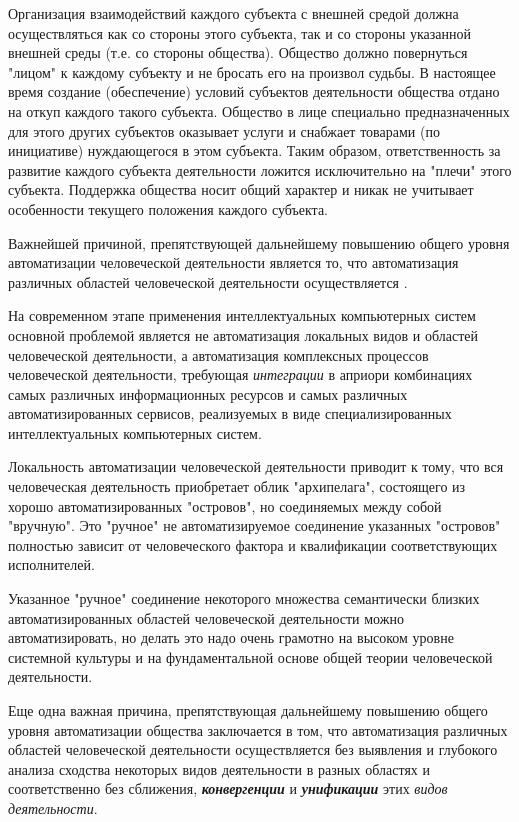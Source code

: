 Организация взаимодействий каждого субъекта с внешней средой должна осуществляться как со стороны этого субъекта, так и со стороны указанной внешней среды (т.е. со стороны общества). Общество должно повернуться "лицом"{} к каждому субъекту и не бросать его на произвол судьбы. В настоящее время создание (обеспечение) условий субъектов деятельности общества отдано на откуп каждого такого субъекта. Общество в лице специально предназначенных для этого других субъектов оказывает услуги и снабжает товарами  (по инициативе) нуждающегося в этом субъекта. Таким образом, ответственность за развитие каждого субъекта деятельности ложится исключительно на "плечи"{} этого субъекта. Поддержка общества носит общий характер и никак не учитывает особенности текущего положения каждого субъекта.

Важнейшей причиной, препятствующей дальнейшему повышению общего уровня автоматизации человеческой деятельности является то, что автоматизация различных областей человеческой деятельности осуществляется .

На современном этапе применения интеллектуальных компьютерных систем основной проблемой является не автоматизация локальных видов и областей человеческой деятельности, а автоматизация комплексных процессов человеческой деятельности, требующая \textit{интеграции} в априори  комбинациях самых различных информационных ресурсов и самых различных автоматизированных сервисов, реализуемых в виде специализированных интеллектуальных компьютерных систем.

Локальность автоматизации человеческой деятельности приводит к тому, что вся человеческая деятельность приобретает облик "архипелага"{}, состоящего из хорошо автоматизированных "островов"{}, но соединяемых между собой "вручную"{}. Это "ручное"{} не автоматизируемое соединение указанных "островов"{} полностью зависит от человеческого фактора и квалификации соответствующих исполнителей.

Указанное "ручное"{} соединение некоторого множества семантически близких автоматизированных областей человеческой деятельности можно автоматизировать, но делать это надо очень грамотно на высоком уровне системной культуры и на фундаментальной основе общей теории человеческой деятельности.

Еще одна важная причина, препятствующая дальнейшему повышению общего уровня автоматизации общества заключается в том, что автоматизация различных областей человеческой деятельности осуществляется без выявления и глубокого анализа сходства некоторых видов деятельности в разных областях и соответственно без сближения, \textbf{\textit{конвергенции}} и \textbf{\textit{унификации}} этих \textit{видов деятельности}.

